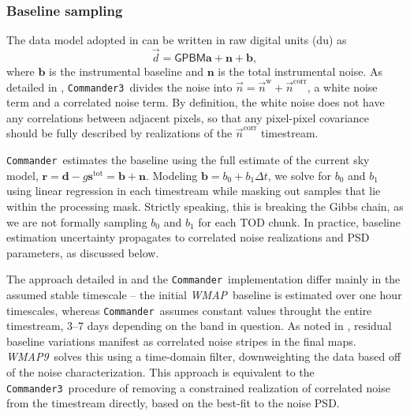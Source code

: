 \documentclass[twocolumn]{../../common/aa}
\def\WMAP{\emph{WMAP}}
\def\WMAPnine{\emph{WMAP9}}
\def\commander{\texttt{Commander}}
\def\commanderthree{\texttt{Commander3}}
\renewcommand{\d}[0]{\vec{d}}
\newcommand{\n}[0]{\vec{n}}
\begin{document}
\subsubsection{Baseline sampling}
\label{ssec:baseline}

The data model adopted in \citet{hinshaw2003a} can be written in raw digital units (du) as
\begin{equation}
	\d = \mathsf{GPBM}\boldsymbol a+\boldsymbol n+\boldsymbol b,
\end{equation}
where $\boldsymbol b$ is the instrumental baseline and $\boldsymbol n$ is the
total instrumental noise. As detailed in \citet{bp06}, \commanderthree\ divides
the noise into $\n=\n^\mathrm w+\n^\mathrm{corr}$, a white noise term and a
correlated noise term. By definition, the white noise does not have any
correlations between adjacent pixels, so that any pixel-pixel covariance should
be fully described by realizations of the $\n^\mathrm{corr}$ timestream.

\commander\ estimates the baseline using the full estimate of the current sky
model, $\boldsymbol r=\boldsymbol d-g\boldsymbol s^\mathrm{tot}=\boldsymbol
b+\boldsymbol n$. Modeling $\boldsymbol b=b_0+b_1\Delta t$, we solve for $b_0$
and $b_1$ using linear regression in each timestream while masking out samples
that lie within the processing mask. Strictly speaking, this is breaking the
Gibbs chain, as we are not formally sampling $b_0$ and $b_1$ for each TOD
chunk. In practice, baseline estimation uncertainty propagates to correlated
noise realizations and PSD parameters, as discussed below.

The approach detailed in \citet{hinshaw2003a} and the \commander\
implementation differ mainly in the assumed stable timescale -- the initial
\WMAP\ baseline is estimated over one hour timescales, whereas \commander\
assumes constant values throught the entire timestream, 3--7 days depending on
the band in question. As noted in \citet{hinshaw2003a}, residual baseline
variations manifest as correlated noise stripes in the final maps. \WMAPnine\
solves this using a time-domain filter, downweighting the data based off of the
noise characterization. This approach is equivalent to the \commanderthree\
procedure of removing a constrained realization of correlated noise from the
timestream directly, based on the best-fit to the noise PSD.

\end{document}
